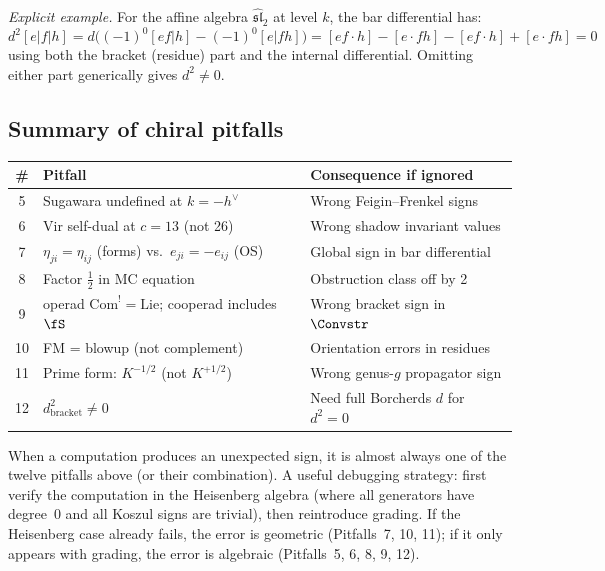 \emph{Explicit example.} For the affine algebra $\hat{\mathfrak{sl}}_2$ at level $k$,
the bar differential has:
\[
d^2[e|f|h] = d\bigl((-1)^0[ef|h] - (-1)^0[e|fh]\bigr)
 = [ef \cdot h] - [e \cdot fh] - [ef \cdot h] + [e \cdot fh] = 0
\]
using both the bracket (residue) part and the internal differential.
Omitting either part generically gives $d^2 \neq 0$.

\subsection{Summary of chiral pitfalls}

\begin{center}
\begin{tabular}{|c|l|l|}
\hline
\textbf{\#} & \textbf{Pitfall} & \textbf{Consequence if ignored} \\
\hline
5 & Sugawara undefined at $k=-h^\vee$ & Wrong Feigin--Frenkel signs \\
6 & Vir self-dual at $c=13$ (not 26) & Wrong shadow invariant values \\
7 & $\eta_{ji} = \eta_{ij}$ (forms) vs.\ $e_{ji} = -e_{ij}$ (OS) & Global sign in bar differential \\
8 & Factor $\frac{1}{2}$ in MC equation & Obstruction class off by 2 \\
9 & operad $\mathrm{Com}^! = \mathrm{Lie}$; cooperad includes $\fS$ & Wrong bracket sign in $\Convstr$ \\
10 & FM = blowup (not complement) & Orientation errors in residues \\
11 & Prime form: $K^{-1/2}$ (not $K^{+1/2}$) & Wrong genus-$g$ propagator sign \\
12 & $d_{\mathrm{bracket}}^2 \neq 0$ & Need full Borcherds $d$ for $d^2=0$ \\
\hline
\end{tabular}
\end{center}

\begin{remark}
When a computation produces an unexpected sign, it is almost always one of
the twelve pitfalls above (or their combination). A useful debugging strategy:
first verify the computation in the Heisenberg algebra (where all generators
have degree~0 and all Koszul signs are trivial), then reintroduce grading.
If the Heisenberg case already fails, the error is geometric (Pitfalls~7,
10, 11); if it only appears with grading, the error is algebraic (Pitfalls~5,
6, 8, 9, 12).
\end{remark}

